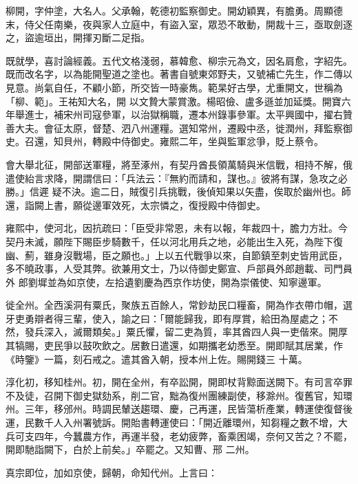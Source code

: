 \begin{pinyinscope}
 柳開，字仲塗，大名人。父承翰，乾德初監察御史。開幼穎異，有膽勇。周顯德末，侍父任南樂，夜與家人立庭中，有盜入室，眾恐不敢動，開裁十三，亟取劍逐之，盜逾垣出，開揮刃斷二足指。



 既就學，喜討論經義。五代文格淺弱，慕韓愈、柳宗元為文，因名肩愈，字紹先。既而改名字，以為能開聖道之塗也。著書自號東郊野夫，又號補亡先生，作二傳以見意。尚氣自任，不顧小節，所交皆一時豪雋。範杲好古學，尤重開文，世稱為「柳、範」。王祐知大名，開
 以文贄大蒙賞激。楊昭儉、盧多遜並加延獎。開寶六年舉進士，補宋州司寇參軍，以治獄稱職，遷本州錄事參軍。太平興國中，擢右贊善大夫。會征太原，督楚、泗八州運糧。選知常州，遷殿中丞，徙潤州，拜監察御史。召還，知貝州，轉殿中侍御史。雍熙二年，坐與監軍忿爭，貶上蔡令。



 會大舉北征，開部送軍糧，將至涿州，有契丹酋長領萬騎與米信戰，相持不解，俄遣使紿言求降，開謂信曰：「兵法云：『無約而請和，謀也。』彼將有謀，急攻之必勝。」信遲
 疑不決。逾二日，賊復引兵挑戰，後偵知果以矢盡，俟取於幽州也。師還，詣闕上書，願從邊軍效死，太宗憐之，復授殿中侍御史。



 雍熙中，使河北，因抗疏曰：「臣受非常恩，未有以報，年裁四十，膽力方壯。今契丹未滅，願陛下賜臣步騎數千，任以河北用兵之地，必能出生入死，為陛下復幽、薊，雖身沒戰場，臣之願也。」上以五代戰爭以來，自節鎮至刺史皆用武臣，多不曉政事，人受其弊。欲兼用文士，乃以侍御史鄭宣、戶部員外郎趙載、司門員外
 郎劉墀並為如京使，左拾遺劉慶為西京作坊使，開為崇儀使、知寧邊軍。



 徙全州。全西溪洞有粟氏，聚族五百餘人，常鈔劫民口糧畜，開為作衣帶巾帽，選牙吏勇辯者得三輩，使入，諭之曰：「爾能歸我，即有厚賞，給田為屋處之；不然，發兵深入，滅爾類矣。」粟氏懼，留二吏為質，率其酋四人與一吏偕來。開厚其犒賜，吏民爭以鼓吹飲之。居數日遣還，如期攜老幼悉至。開即賦其居業，作《時鑒》一篇，刻石戒之。遣其酋入朝，授本州上佐。賜開錢三
 十萬。



 淳化初，移知桂州。初，開在全州，有卒訟開，開即杖背黥面送闕下。有司言卒罪不及徒，召開下御史獄劾系，削二官，黜為復州團練副使，移滁州。復舊官，知環州。三年，移邠州。時調民輦送趨環、慶，己再運，民皆蕩析產業，轉運使復督後運，民數千人入州署號訴。開貽書轉運使曰：「開近離環州，知芻糧之數不增，大兵可支四年，今蠶農方作，再運半發，老幼疲弊，畜乘困竭，奈何又苦之？不罷，開即馳詣闕下，白於上前矣。」卒罷之。又知曹、邢
 二州。



 真宗即位，加如京使，歸朝，命知代州。上言曰：




\end{pinyinscope}
